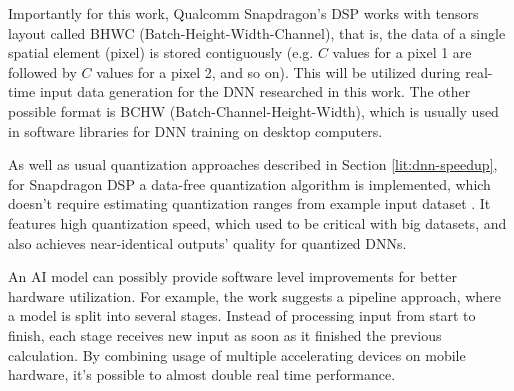 Importantly for this work, Qualcomm Snapdragon's DSP works with tensors layout called BHWC (Batch-Height-Width-Channel), that is, the data of a single spatial element (pixel) is stored contiguously (e.g. $C$ values for a pixel 1 are followed by $C$ values for a pixel 2, and so on). This will be utilized during real-time input data generation for the DNN researched in this work. The other possible format is BCHW (Batch-Channel-Height-Width), which is usually used in software libraries for DNN training on desktop computers.

As well as usual quantization approaches described in Section \ref{lit:dnn-speedup}, for Snapdragon DSP a data-free quantization algorithm is implemented, which doesn't require estimating quantization ranges from example input dataset \cite{speed:datafreequant19}. It features high quantization speed, which used to be critical with big datasets, and also achieves near-identical outputs' quality for quantized DNNs.

An AI model can possibly provide software level improvements for better hardware utilization. For example, the work \cite{mobile:pipelining20} suggests a pipeline approach, where a model is split into several stages. Instead of processing input from start to finish, each stage receives new input as soon as it finished the previous calculation. By combining usage of multiple accelerating devices on mobile hardware, it's possible to almost double real time performance.


